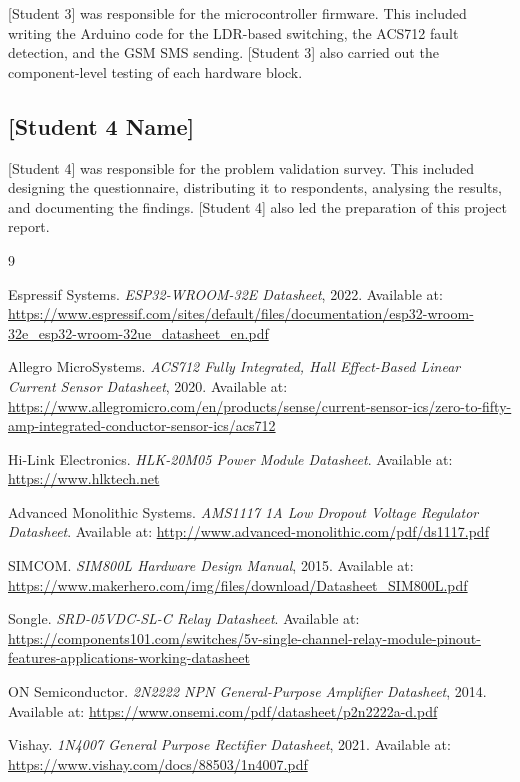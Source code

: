 \documentclass[12pt,a4paper]{article}
\begin{document}
[Student 3] was responsible for the microcontroller firmware. This included writing the Arduino code for the LDR-based switching, the ACS712 fault detection, and the GSM SMS sending. [Student 3] also carried out the component-level testing of each hardware block.

\subsection{[Student 4 Name]}

[Student 4] was responsible for the problem validation survey. This included designing the questionnaire, distributing it to respondents, analysing the results, and documenting the findings. [Student 4] also led the preparation of this project report.

\newpage
\begin{thebibliography}{9}

Espressif Systems.
\textit{ESP32-WROOM-32E Datasheet}, 2022.
Available at: \url{https://www.espressif.com/sites/default/files/documentation/esp32-wroom-32e_esp32-wroom-32ue_datasheet_en.pdf}

Allegro MicroSystems.
\textit{ACS712 Fully Integrated, Hall Effect-Based Linear Current Sensor Datasheet}, 2020.
Available at: \url{https://www.allegromicro.com/en/products/sense/current-sensor-ics/zero-to-fifty-amp-integrated-conductor-sensor-ics/acs712}

Hi-Link Electronics.
\textit{HLK-20M05 Power Module Datasheet}.
Available at: \url{https://www.hlktech.net}

Advanced Monolithic Systems.
\textit{AMS1117 1A Low Dropout Voltage Regulator Datasheet}.
Available at: \url{http://www.advanced-monolithic.com/pdf/ds1117.pdf}

SIMCOM.
\textit{SIM800L Hardware Design Manual}, 2015.
Available at: \url{https://www.makerhero.com/img/files/download/Datasheet_SIM800L.pdf}

Songle.
\textit{SRD-05VDC-SL-C Relay Datasheet}.
Available at: \url{https://components101.com/switches/5v-single-channel-relay-module-pinout-features-applications-working-datasheet}

ON Semiconductor.
\textit{2N2222 NPN General-Purpose Amplifier Datasheet}, 2014.
Available at: \url{https://www.onsemi.com/pdf/datasheet/p2n2222a-d.pdf}

Vishay.
\textit{1N4007 General Purpose Rectifier Datasheet}, 2021.
Available at: \url{https://www.vishay.com/docs/88503/1n4007.pdf}

\end{thebibliography}
\end{document}
